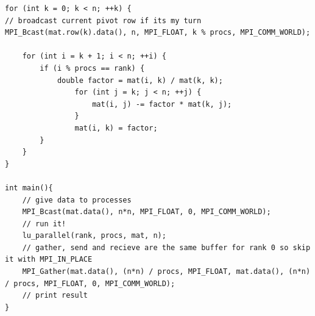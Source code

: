 \documentclass[12pt,letterpaper]{article}
\begin{document}
\begin{lstlisting}
for (int k = 0; k < n; ++k) {
// broadcast current pivot row if its my turn
MPI_Bcast(mat.row(k).data(), n, MPI_FLOAT, k % procs, MPI_COMM_WORLD);

    for (int i = k + 1; i < n; ++i) {
        if (i % procs == rank) {
            double factor = mat(i, k) / mat(k, k);
                for (int j = k; j < n; ++j) {
                    mat(i, j) -= factor * mat(k, j);
                }
                mat(i, k) = factor;
        }
    }
}

int main(){
    // give data to processes
    MPI_Bcast(mat.data(), n*n, MPI_FLOAT, 0, MPI_COMM_WORLD);
    // run it!
    lu_parallel(rank, procs, mat, n);
    // gather, send and recieve are the same buffer for rank 0 so skip it with MPI_IN_PLACE
    MPI_Gather(mat.data(), (n*n) / procs, MPI_FLOAT, mat.data(), (n*n) / procs, MPI_FLOAT, 0, MPI_COMM_WORLD);
    // print result
}
\end{lstlisting}
\end{document}
